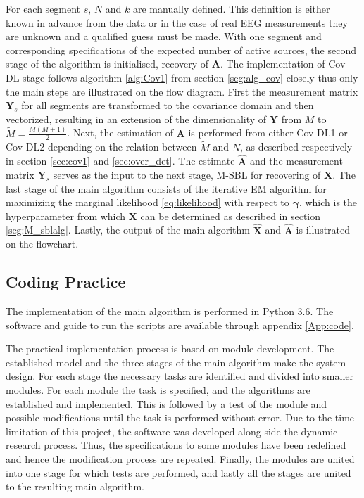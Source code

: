 For each segment $s$, $N$ and $k$ are manually defined. 
This definition is either known in advance from the data or in the case of real EEG measurements they are unknown and a qualified guess must be made.
With one segment and corresponding specifications of the expected number of active sources, the second stage of the algorithm is initialised, recovery of $\mathbf{A}$.
The implementation of Cov-DL stage follows algorithm \ref{alg:Cov1} from section \ref{seg:alg_cov} closely thus only the main steps are illustrated on the flow diagram.
First the measurement matrix $\mathbf{Y}_s$ for all segments are transformed to the covariance domain and then vectorized, resulting in an extension of the dimensionality of $\mathbf{Y}$ from $M$ to $\widetilde{M} = \frac{M(M+1)}{2}$.
Next, the estimation of $\mathbf{A}$ is performed from either Cov-DL1 or Cov-DL2 depending on the relation between $\widetilde{M}$ and $N$, as described respectively in section \ref{sec:cov1} and \ref{sec:over_det}.
The estimate $\hat{\mathbf{A}}$ and the measurement matrix $\mathbf{Y}_s$ serves as the input to the next stage, M-SBL for recovering of $\mathbf{X}$. 
The last stage of the main algorithm consists of the iterative EM algorithm for maximizing the marginal likelihood \eqref{eq:likelihood} with respect to $\boldsymbol{\gamma}$, which is the hyperparameter from which $\mathbf{X}$ can be determined as described in section \ref{seg:M_sblalg}. 
Lastly, the output of the main algorithm $\hat{\mathbf{X}}$ and $\hat{\mathbf{A}}$ is illustrated on the flowchart.

\subsection{Coding Practice}
The implementation of the main algorithm is performed in Python 3.6. The software and guide to run the scripts are available through appendix \ref{App:code}.

The practical implementation process is based on module development. 
The established model and the three stages of the main algorithm make the system design. 
For each stage the necessary tasks are identified and divided into smaller modules. 
For each module the task is specified, and the algorithms are established and implemented. 
This is followed by a test of the module and possible modifications until the task is performed without error. 
Due to the time limitation of this project, the software was developed along side the dynamic research process. 
Thus, the specifications to some modules have been redefined and hence the modification process are repeated. 
Finally, the modules are united into one stage for which tests are performed, and lastly all the stages are united to the resulting main algorithm.

